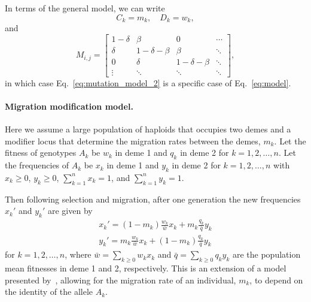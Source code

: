 \documentclass[9pt, a4paper, twocolumn]{extarticle}
\begin{document}
In terms of the general model, we can write
\begin{equation}
C_k = m_k, \quad
D_k = w_k,
\end{equation}
and
\begin{equation}
M_{i,j} = \begin{bmatrix}
1-\delta & \beta & 0 &  \cdots \\
\delta & 1-\delta-\beta & \beta &  \ddots \\
0 & \delta & 1-\delta-\beta & \ddots \\
\vdots & \ddots & \ddots & \ddots 
\end{bmatrix},
\end{equation}
in which case Eq.~\ref{eq:mutation_model_2} is a specific case of Eq.~\ref{eq:model}.


\paragraph*{Migration modification model.}\label{sec:mig_model_1}

Here we assume a large population of haploids that occupies two demes and a modifier locus that determine the migration rates between the demes, $m_k$. 
Let the fitness of genotypes $A_k$ be $w_k$ in deme 1 and $q_k$ in deme 2 for $k=1,2,\ldots,n$.
Let the frequencies of $A_k$ be $x_k$ in deme 1 and $y_k$ in deme 2 for $k=1,2,\ldots,n$ with $x_k \ge 0$, $y_k \ge 0$, $\sum_{k=1}^{n}{x_k} = 1$, and $\sum_{k=1}^{n}{y_k} = 1$.

Then following selection and migration, after one generation the new frequencies $x_k'$ and $y_k'$ are given by
\begin{align}
x_k' = (1-m_k) \frac{w_k}{\bar{w}} x_k + m_k \frac{q_k}{\bar{q}} y_k \\
y_k' = m_k \frac{w_k}{\bar{w}} x_k + (1 - m_k) \frac{q_k}{\bar{q}} y_k
\end{align}
for $k=1,2,\ldots,n$, where $\bar{w} = \sum_{k \ge 0}{w_k x_k}$ and $\bar{q} = \sum_{k \ge 0}{q_k y_k}$ are the population mean fitnesses in deme 1 and 2, respectively.
This is an extension of a model presented by~\citet{Altenberg2017}, allowing for the migration rate of an individual, $m_k$, to depend on the identity of the allele $A_k$.
\end{document}
